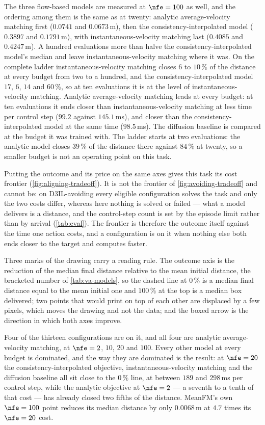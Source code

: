 The three flow-based models are measured at $\nfe=100$ as well, and the ordering among them is the same as
at twenty: analytic average-velocity matching first ($0.0741$ and $0.0673$\,m), then the
consistency-interpolated model ($0.3897$ and $0.1791$\,m), with instantaneous-velocity matching last
($0.4085$ and $0.4247$\,m). A hundred evaluations more than halve the consistency-interpolated model's
median and leave instantaneous-velocity matching where it was. On the complete ladder
instantaneous-velocity matching closes $6$ to $10\,\%$ of the distance at every budget from two to a hundred,
and the consistency-interpolated model $17$, $6$, $14$ and $60\,\%$, so at ten evaluations it is at the
level of instantaneous-velocity matching. Analytic average-velocity matching leads at every budget: at ten
evaluations it ends closer than instantaneous-velocity matching at less time per control step ($99.2$
against $145.1$\,ms), and closer than the consistency-interpolated model at the same time ($98.5$\,ms). The diffusion baseline is compared at the
budget it was trained with. The ladder starts at two evaluations: the analytic model closes $39\,\%$ of
the distance there against $84\,\%$ at twenty, so a smaller budget is not an operating point on this
task.

Putting the outcome and its price on the same axes gives this task its cost frontier
(\autoref{fig:aligning-tradeoff}). It is not the frontier of \autoref{fig:avoiding-tradeoff} and cannot
be: on D3IL-avoiding every eligible configuration solves the task and only the two costs differ, whereas
here nothing is solved or failed --- what a model delivers is a distance, and the control-step count is
set by the episode limit rather than by arrival (\autoref{tab:eval}). The frontier is therefore the
outcome itself against the time one action costs, and a configuration is on it when nothing else both
ends closer to the target and computes faster.

Three marks of the drawing carry a reading rule. The outcome axis is the reduction of the median final
distance relative to the mean initial distance, the bracketed number of \autoref{tab:va-models}, so the
dashed line at $0\,\%$ is a median final distance equal to the mean initial one and $100\,\%$ at the top is
a median box delivered; two points
that would print on top of each other are displaced by a few pixels, which moves the drawing and not the
data; and the boxed arrow is the direction in which both axes improve.

Four of the thirteen configurations are on it, and all four are analytic average-velocity matching, at
$\nfe=2$, $10$, $20$ and $100$. Every other model at every budget is dominated, and the way they are dominated
is the result: at $\nfe=20$ the consistency-interpolated objective, instantaneous-velocity matching and
the diffusion baseline all sit close to the $0\,\%$ line, at between $189$
and $298$\,ms per control step, while the analytic objective at $\nfe=2$ --- a seventh to a tenth of
that cost --- has already closed two fifths of the distance. MeanFM's own $\nfe=100$ point reduces its median distance
by only $0.0068$\,m at $4.7$ times its $\nfe=20$ cost.

